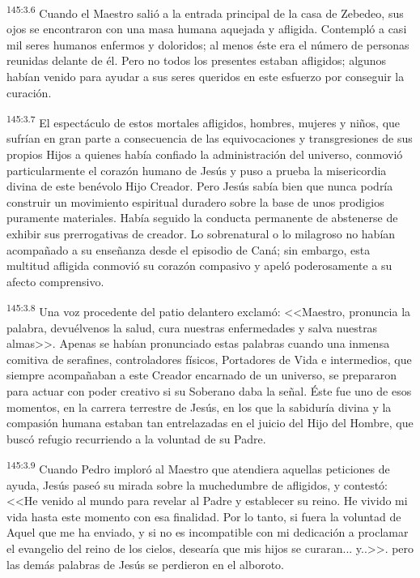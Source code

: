\par 
\textsuperscript{145:3.6} Cuando el Maestro salió a la entrada principal de la casa de Zebedeo, sus ojos se encontraron con una masa humana aquejada y afligida. Contempló a casi mil seres humanos enfermos y doloridos; al menos éste era el número de personas reunidas delante de él. Pero no todos los presentes estaban afligidos; algunos habían venido para ayudar a sus seres queridos en este esfuerzo por conseguir la curación.

\par 
\textsuperscript{145:3.7} El espectáculo de estos mortales afligidos, hombres, mujeres y niños, que sufrían en gran parte a consecuencia de las equivocaciones y transgresiones de sus propios Hijos a quienes había confiado la administración del universo, conmovió particularmente el corazón humano de Jesús y puso a prueba la misericordia divina de este benévolo Hijo Creador. Pero Jesús sabía bien que nunca podría construir un movimiento espiritual duradero sobre la base de unos prodigios puramente materiales. Había seguido la conducta permanente de abstenerse de exhibir sus prerrogativas de creador. Lo sobrenatural o lo milagroso no habían acompañado a su enseñanza desde el episodio de Caná; sin embargo, esta multitud afligida conmovió su corazón compasivo y apeló poderosamente a su afecto comprensivo.

\par 
\textsuperscript{145:3.8} Una voz procedente del patio delantero exclamó: <<Maestro, pronuncia la palabra, devuélvenos la salud, cura nuestras enfermedades y salva nuestras almas>>. Apenas se habían pronunciado estas palabras cuando una inmensa comitiva de serafines, controladores físicos, Portadores de Vida e intermedios, que siempre acompañaban a este Creador encarnado de un universo, se prepararon para actuar con poder creativo si su Soberano daba la señal. Éste fue uno de esos momentos, en la carrera terrestre de Jesús, en los que la sabiduría divina y la compasión humana estaban tan entrelazadas en el juicio del Hijo del Hombre, que buscó refugio recurriendo a la voluntad de su Padre.

\par 
\textsuperscript{145:3.9} Cuando Pedro imploró al Maestro que atendiera aquellas peticiones de ayuda, Jesús paseó su mirada sobre la muchedumbre de afligidos, y contestó: <<He venido al mundo para revelar al Padre y establecer su reino. He vivido mi vida hasta este momento con esa finalidad. Por lo tanto, si fuera la voluntad de Aquel que me ha enviado, y si no es incompatible con mi dedicación a proclamar el evangelio del reino de los cielos, desearía que mis hijos se curaran... y..>>. pero las demás palabras de Jesús se perdieron en el alboroto.

